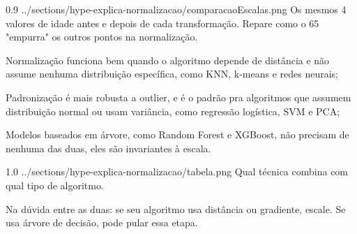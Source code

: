 {\articleimage
{0.9}
{../sections/hype-explica-normalizacao/comparacaoEscalas.png}
{Os mesmos 4 valores de idade antes e depois de cada transformação. Repare como o 65 "empurra" os outros pontos na normalização.}

\subtitle{Quando usar qual}

\begin{hypeitemize}
\item Normalização funciona bem quando o algoritmo depende de distância e não assume nenhuma distribuição específica, como KNN, k-means e redes neurais;
\item Padronização é mais robusta a outlier, e é o padrão pra algoritmos que assumem distribuição normal ou usam variância, como regressão logística, SVM e PCA;
\item Modelos baseados em árvore, como Random Forest e XGBoost, não precisam de nenhuma das duas, eles são invariantes à escala.
\end{hypeitemize}

\articleimage
{1.0}
{../sections/hype-explica-normalizacao/tabela.png}
{Qual técnica combina com qual tipo de algoritmo.}

\begin{infobox}
Na dúvida entre as duas: se seu algoritmo usa distância ou gradiente, escale. Se usa árvore de decisão, pode pular essa etapa.
\end{infobox}


}